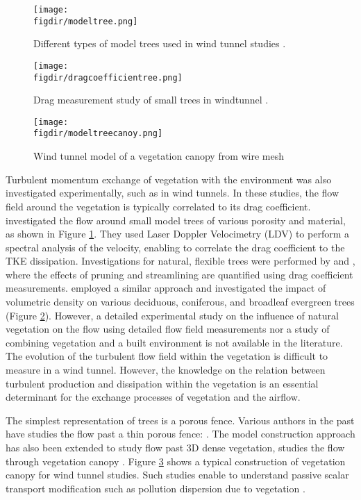 	\begin{figure}[t]
		\centering
		\texttt{[image: \\figdir/modeltree.png]}
		\caption{Different types of model trees used in wind tunnel studies \citep{Gromke2008a}. }
		\label{fig:modeltree}
	\end{figure}
	
	\begin{figure}[p]
		\centering
		\texttt{[image: \\figdir/dragcoefficientree.png]}
		\caption{Drag measurement study of small trees in windtunnel \citep{Cao2012}.}
		\label{fig:dragcoefficientree}
	\end{figure}
	
	\begin{figure}[p]
		\centering
		\texttt{[image: \\figdir/modeltreecanoy.png]}
		\caption{Wind tunnel model of a vegetation canopy from wire mesh  \citep{Conan2015}}
		\label{fig:modeltreecanoy}
	\end{figure}

Turbulent momentum exchange of vegetation with the environment was also investigated experimentally, such as in wind tunnels. In these studies, the flow field around the vegetation is typically correlated to its drag coefficient. \cite{Gromke2008a} investigated the flow around small model trees of various porosity and material, as shown in Figure \ref{fig:modeltree}. They used Laser Doppler Velocimetry (LDV) to perform a spectral analysis of the velocity, enabling to correlate the drag coefficient to the TKE dissipation. Investigations for natural, flexible trees were performed by \cite{Vollsinger2005a} and \cite{Vollsinger2005}, where the effects of pruning and streamlining are quantified using drag coefficient measurements. \cite{Cao2012} employed a similar approach and investigated the impact of volumetric density on various deciduous, coniferous, and broadleaf evergreen trees (Figure \ref{fig:dragcoefficientree}). However, a detailed experimental study on the influence of natural vegetation on the flow using detailed flow field measurements nor a study of combining vegetation and a built environment is not available in the literature. The evolution of the turbulent flow field within the vegetation is difficult to measure in a wind tunnel. However, the knowledge on the relation between turbulent production and dissipation within the vegetation is an essential determinant for the exchange processes of vegetation and the airflow. 

The simplest representation of trees is a porous fence. Various authors in the past have studies the flow past a thin porous fence: \citep{Gandemer1979, Dong2010, Perera1981,Hagen1971,Conan2015}. The model construction approach has also been extended to study flow past 3D dense vegetation, studies the flow through vegetation canopy \citep{Conan2015,Poggi2004}. Figure \ref{fig:modeltreecanoy} shows a typical construction of vegetation canopy for wind tunnel studies. Such studies enable to understand passive scalar transport modification such as pollution dispersion due to vegetation \citep{Gromke2011,Gromke2008}.

